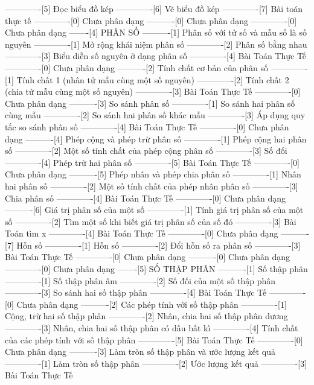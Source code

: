 -------------[5] Đọc biểu đồ kép
-------------[6] Vẽ biểu đồ kép
-------------[7] Bài toán thực tế
-------------[0] Chưa phân dạng
----------[0] Chưa phân dạng
-------------[0] Chưa phân dạng
-------[4] PHÂN SỐ
----------[1] Phân số với tử số và mẫu số là số nguyên
-------------[1] Mở rộng khái niệm phân số
-------------[2] Phân số bằng nhau
-------------[3] Biểu diễn số nguyên ở dạng phân số
-------------[4] Bài Toán Thực Tế
-------------[0] Chưa phân dạng
----------[2] Tính chất cơ bản của phân số
-------------[1] Tính chất 1 (nhân tử mẫu cùng một số nguyên)
-------------[2] Tính chất 2 (chia tử mẫu cùng một số nguyên)
-------------[3] Bài Toán Thực Tế
-------------[0] Chưa phân dạng
----------[3] So sánh phân số
-------------[1] So sánh hai phân số cùng mẫu
-------------[2] So sánh hai phân số khác mẫu
-------------[3] Áp dụng quy tắc so sánh phân số
-------------[4] Bài Toán Thực Tế
-------------[0] Chưa phân dạng
----------[4] Phép cộng và phép trừ phân số
-------------[1] Phép cộng hai phân số
-------------[2] Một số tính chất của phép cộng phân số
-------------[3] Số đối
-------------[4] Phép trừ hai phân số
-------------[5] Bài Toán Thực Tế
-------------[0] Chưa phân dạng
----------[5] Phép nhân và phép chia phân số
-------------[1] Nhân hai phân số
-------------[2] Một số tính chất của phép nhân phân số
-------------[3] Chia phân số
-------------[4] Bài Toán Thực Tế
-------------[0] Chưa phân dạng
----------[6] Giá trị phân số của một số
-------------[1] Tính giá trị phân số của một số
-------------[2] Tìm một số khi biết giá trị phân số của số đó
-------------[3] Bài Toán tìm x
-------------[4] Bài Toán Thực Tế
-------------[0] Chưa phân dạng
----------[7] Hỗn số
-------------[1] Hỗn số
-------------[2] Đổi hỗn số ra phân số
-------------[3] Bài Toán Thực Tế
-------------[0] Chưa phân dạng
----------[0] Chưa phân dạng
-------------[0] Chưa phân dạng
-------[5] SỐ THẬP PHÂN
----------[1] Số thập phân
-------------[1] Số thập phân âm
-------------[2] Số đối của một số thập phân
-------------[3] So sánh hai số thập phân
-------------[4] Bài Toán Thực Tế
-------------[0] Chưa phân dạng
----------[2] Các phép tính với số thập phân
-------------[1] Cộng, trừ hai số thập phân
-------------[2] Nhân, chia hai số thập phân dương
-------------[3] Nhân, chia hai số thập phân có dấu bất kì
-------------[4] Tính chất của các phép tính với số thập phân
-------------[5] Bài Toán Thực Tế
-------------[0] Chưa phân dạng
----------[3] Làm tròn số thập phân và ước lượng kết quả
-------------[1] Làm tròn số thập phân
-------------[2] Ước lượng kết quả
-------------[3] Bài Toán Thực Tế
